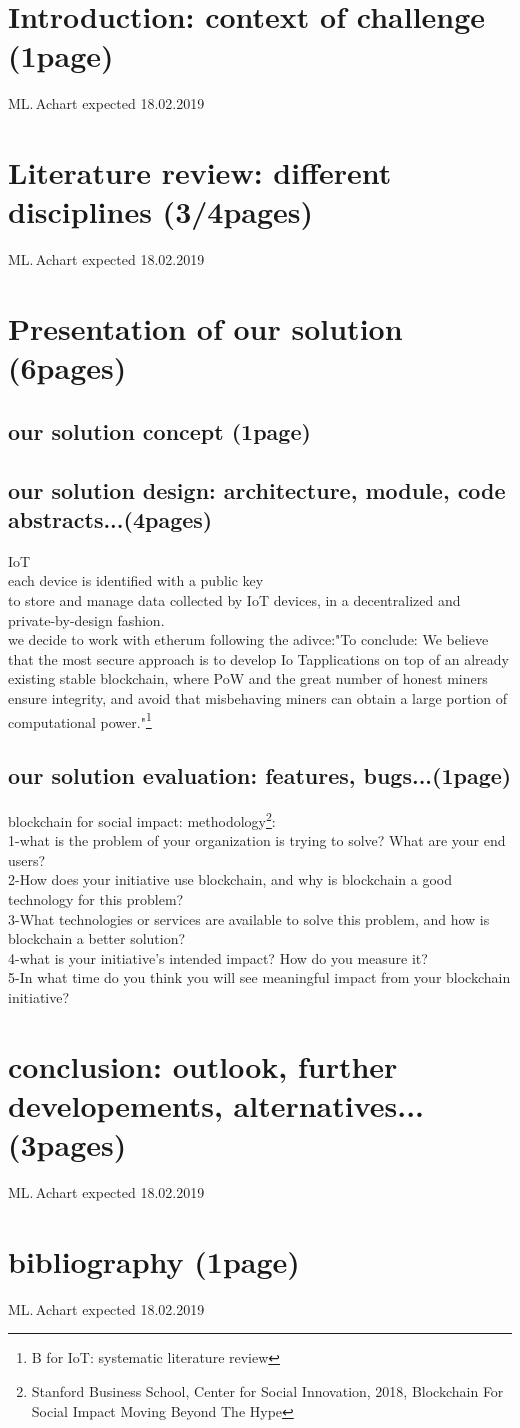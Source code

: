 \documentclass[11pt]{article}
\begin{document}
\section{Introduction: context of challenge (1page)}
ML.\,Achart expected 18.02.2019

\section{Literature review: different disciplines (3/4pages)}
ML.\,Achart expected 18.02.2019

\section{Presentation of our solution (6pages)}
\subsection{our solution concept (1page)}
\subsection{our solution design: architecture, module, code abstracts...(4pages)}
IoT\\
each device is identified with a public key\\
to store and manage data collected by IoT devices, in a decentralized and private-by-design fashion.\\
we decide to work with etherum following the adivce:"To conclude: We believe that the most secure approach is to develop Io Tapplications on top of an already existing stable blockchain, where PoW and the great number of honest miners ensure integrity, and avoid that misbehaving miners can obtain a large portion of computational power."\footnote{B for IoT: systematic literature review}\\
\subsection{our solution evaluation: features, bugs...(1page)}
blockchain for social impact: methodology\footnote{Stanford Business School, Center for Social Innovation, 2018, Blockchain For Social Impact Moving Beyond The Hype}:\\
1-what is the problem of your organization is trying to solve? What are your end users?\\
2-How does your initiative use blockchain, and why is blockchain a good technology for this problem?\\
3-What technologies or services are available to solve this problem, and how is blockchain a better solution?\\
4-what is your initiative's intended impact? How do you measure it?\\
5-In what time do you think you will see meaningful impact from your blockchain initiative?\\

\section{conclusion: outlook, further developements, alternatives... (3pages)}
ML.\,Achart expected 18.02.2019

\section{bibliography (1page)}
ML.\,Achart expected 18.02.2019
	
\end{document}
